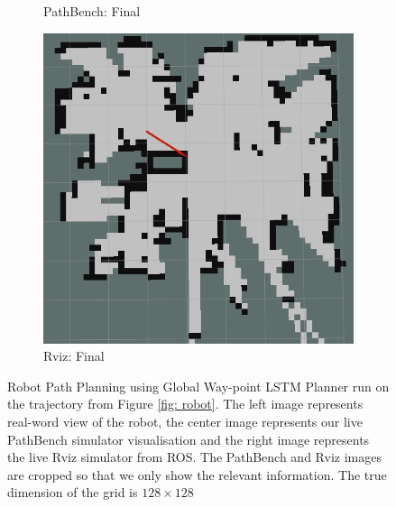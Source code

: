 \begin{figure}[htb]
\begin{subfigure}[b]{0.32\linewidth}
     \caption{PathBench: Final}
  \end{subfigure}
  \hfill
  \begin{subfigure}[b]{0.32\linewidth}
    \includegraphics[width=\linewidth]{images/real/sys/final_3.png}
     \caption{Rviz: Final}
  \end{subfigure}
  
  \caption{Robot Path Planning using Global Way-point LSTM Planner run on the trajectory from Figure \ref{fig: robot}. The left image represents real-word view of the robot, the center image represents our live PathBench simulator visualisation and the right image represents the live Rviz simulator from ROS. The PathBench and Rviz images are cropped so that we only show the relevant information. The true dimension of the grid is $128 \times 128$}
  \label{fig: robot_run}
\end{figure}

\clearpage


